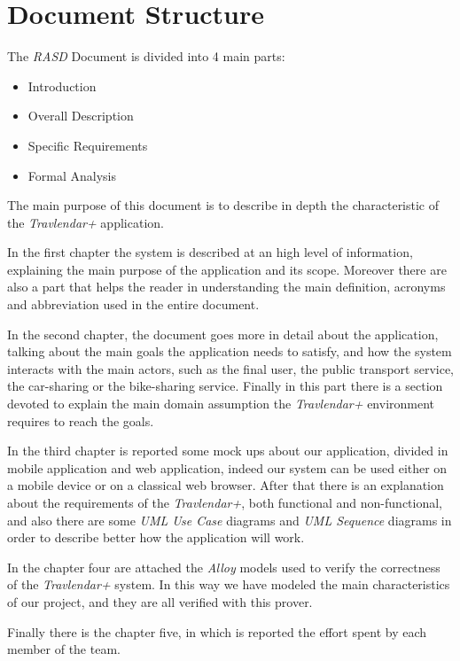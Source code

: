 \section{Document Structure}
The \emph{RASD} Document is divided into 4 main parts:
\begin{itemize}
    \item Introduction
    \item Overall Description
    \item Specific Requirements
    \item Formal Analysis
\end{itemize}
The main purpose of this document is to describe in depth the characteristic of the \emph{Travlendar+} application.

In the first chapter the system is described at an high level of information, explaining the main purpose of the application and its scope. Moreover there are also a part that helps the reader in understanding the main definition, acronyms and abbreviation used in the entire document.

In the second chapter, the document goes more in detail about the application, talking about the main goals the application needs to satisfy, and how the system interacts with the main actors, such as the final user, the public transport service, the car-sharing or the bike-sharing service. Finally in this part there is a section devoted to explain the main domain assumption the \emph{Travlendar+} environment requires to reach the goals.

In the third chapter is reported some mock ups about our application, divided in mobile application and web application, indeed our system can be used either on a mobile device or on a classical web browser. After that there is an explanation about the requirements of the \emph{Travlendar+}, both functional and non-functional, and also there are some \emph{UML Use Case} diagrams and \emph{UML Sequence} diagrams in order to describe better how the application will work.

In the chapter four are attached the \emph{Alloy} models used to verify the correctness of the \emph{Travlendar+} system. In this way we have modeled the main characteristics of our project, and they are all verified with this prover.

Finally there is the chapter five, in which is reported the effort spent by each member of the team.

